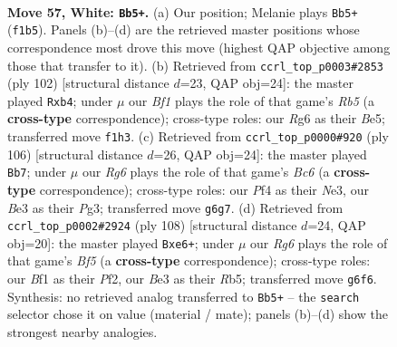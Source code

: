 \documentclass[11pt]{article}
\begin{document}
\clearpage

\begin{figure}[p]\centering
\begin{subfigure}{0.46\textwidth}\centering
\resizebox{\linewidth}{!}{%
\newchessgame
\chessboard[
  setfen={8/p1pk4/5nR1/5p2/r4P2/4B3/2K4P/5B2 w - - 0 57},
  showmover=false,
  pgfstyle=straightmove, color=movearrow, markmove={f1-b5}
]}
\caption{}
\end{subfigure}\hfill
\begin{subfigure}{0.46\textwidth}\centering
\resizebox{\linewidth}{!}{%
\newchessgame
\chessboard[
  setfen={8/6pk/5n1p/1R2B3/1pB5/5K2/3r3P/8 w - - 14 52},
  showmover=false,
  pgfstyle=straightmove, color=movearrow, markmove={b5-b4}
]}
\caption{}
\end{subfigure}
\\[4pt]
\begin{subfigure}{0.46\textwidth}\centering
\resizebox{\linewidth}{!}{%
\newchessgame
\chessboard[
  setfen={5k2/3n1pp1/r1B5/7p/3B3P/4N1P1/3K4/8 w - - 12 54},
  showmover=false,
  pgfstyle=straightmove, color=movearrow, markmove={c6-b7}
]}
\caption{}
\end{subfigure}\hfill
\begin{subfigure}{0.46\textwidth}\centering
\resizebox{\linewidth}{!}{%
\newchessgame
\chessboard[
  setfen={8/5k2/1p1rn3/1R2pBp1/6P1/8/5P2/5K2 w - - 4 55},
  showmover=false,
  pgfstyle=straightmove, color=movearrow, markmove={f5-e6}
]}
\caption{}
\end{subfigure}
\caption{\textbf{Move 57, White: \texttt{Bb5+}.} (a) Our position; Melanie plays \texttt{Bb5+} (\texttt{f1b5}). Panels (b)--(d) are the retrieved master positions whose correspondence most drove this move (highest QAP objective among those that transfer to it). (b) Retrieved from \texttt{ccrl\_top\_p0003\#2853} (ply 102) [structural distance $d$=23, QAP obj=24]: the master played \texttt{Rxb4}; under $\mu$ our \emph{Bf1} plays the role of that game's \emph{Rb5} (a \textbf{cross-type} correspondence); cross-type roles: our \emph{R}g6 as their \emph{B}e5; transferred move \texttt{f1h3}. (c) Retrieved from \texttt{ccrl\_top\_p0000\#920} (ply 106) [structural distance $d$=26, QAP obj=24]: the master played \texttt{Bb7}; under $\mu$ our \emph{Rg6} plays the role of that game's \emph{Bc6} (a \textbf{cross-type} correspondence); cross-type roles: our \emph{P}f4 as their \emph{N}e3, our \emph{B}e3 as their \emph{P}g3; transferred move \texttt{g6g7}. (d) Retrieved from \texttt{ccrl\_top\_p0002\#2924} (ply 108) [structural distance $d$=24, QAP obj=20]: the master played \texttt{Bxe6+}; under $\mu$ our \emph{Rg6} plays the role of that game's \emph{Bf5} (a \textbf{cross-type} correspondence); cross-type roles: our \emph{B}f1 as their \emph{P}f2, our \emph{B}e3 as their \emph{R}b5; transferred move \texttt{g6f6}. Synthesis: no retrieved analog transferred to \texttt{Bb5+} -- the \texttt{search} selector chose it on value (material / mate); panels (b)--(d) show the strongest nearby analogies.}
\label{fig:thought-m112}
\end{figure}
\end{document}
